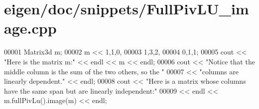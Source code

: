 \hypertarget{eigen_2doc_2snippets_2_full_piv_l_u__image_8cpp_source}{}\section{eigen/doc/snippets/\+Full\+Piv\+L\+U\+\_\+image.cpp}
\label{eigen_2doc_2snippets_2_full_piv_l_u__image_8cpp_source}

\begin{DoxyCode}
00001 Matrix3d m;
00002 m << 1,1,0,
00003      1,3,2,
00004      0,1,1;
00005 cout << \textcolor{stringliteral}{"Here is the matrix m:"} << endl << m << endl;
00006 cout << \textcolor{stringliteral}{"Notice that the middle column is the sum of the two others, so the "}
00007      << \textcolor{stringliteral}{"columns are linearly dependent."} << endl;
00008 cout << \textcolor{stringliteral}{"Here is a matrix whose columns have the same span but are linearly independent:"}
00009      << endl << m.fullPivLu().image(m) << endl;
\end{DoxyCode}
